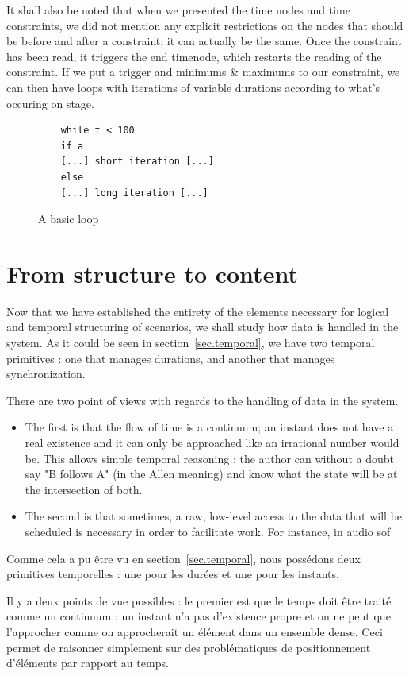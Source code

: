 \documentclass{sigchi}
\begin{document}
It shall also be noted that when we presented the time nodes and time constraints, we did not mention any explicit restrictions on the nodes that should be before and after a constraint; it can actually be the same. Once the constraint has been read, it triggers the end timenode, which restarts the reading of the constraint. If we put a trigger and minimums \& maximums to our constraint, we can then have loops with iterations of variable durations according to what's occuring on stage.

\begin{figure}
	\centering
	\begin{lstlisting}
	while t < 100
	if a
	[...] short iteration [...]
	else
	[...] long iteration [...]           
	\end{lstlisting}
	\caption{A basic loop}	
	\label{fig.loopcode}
\end{figure}

\section{From structure to content}
Now that we have established the entirety of the elements necessary for logical and temporal structuring of scenarios, we shall study how data is handled in the system.
As it could be seen in section~\ref{sec.temporal}, we have two temporal primitives : one that manages durations, and another that manages synchronization.

There are two point of views with regards to the handling of data in the system.

\begin{itemize}
	\item The first is that the flow of time is a continuum; an instant does not have a real existence and it can only be approached like an irrational number would be.
	This allows simple temporal reasoning : the author can without a doubt say "B follows A" (in the Allen meaning) and know what the state will be at the intersection of both.
	\item The second is that sometimes, a raw, low-level access to the data that will be scheduled is necessary in order to facilitate work. For instance, in audio sof  
\end{itemize}

Comme cela a pu être vu en section~\ref{sec.temporal}, nous possédons deux primitives temporelles : une pour les durées et une pour les instants.

Il y a deux points de vue possibles : le premier est que le temps doit être traité comme un continuum : un instant n'a pas d'existence propre et on ne peut que l'approcher comme on approcherait un élément dans un ensemble dense. Ceci permet de raisonner simplement sur des problématiques de positionnement d'éléments par rapport au temps.
\end{document}
